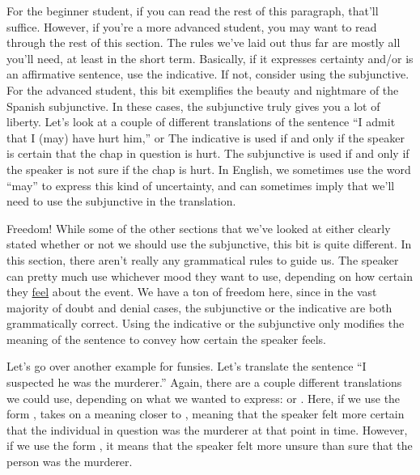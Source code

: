 For the beginner student, if you can read the rest of this paragraph, that'll suffice. However, if you're a more advanced student, you may want to read through the rest of this section. The rules we've laid out thus far are mostly all you'll need, at least in the short term. Basically, if it expresses certainty and/or is an affirmative sentence, use the indicative. If not, consider using the subjunctive. \\

For the advanced student, this bit exemplifies the beauty and nightmare of the Spanish subjunctive. In these cases, the subjunctive truly gives you a lot of liberty. Let's look at a couple of different translations of the sentence ``I admit that I (may) have hurt him,''  or  The indicative is used if and only if the speaker is certain that the chap in question is hurt. The subjunctive is used if and only if the speaker is not sure if the chap is hurt. In English, we sometimes use the word ``may'' to express this kind of uncertainty, and can sometimes imply that we'll need to use the subjunctive in the translation.

\begin{conf}{Freedom!}
	While some of the other sections that we've looked at either clearly stated whether or not we should use the subjunctive, this bit is quite different. In this section, there aren't really any grammatical rules to guide us. The speaker can pretty much use whichever mood they want to use, depending on how certain they \underline{feel} about the event. We have a ton of freedom here, since in the vast majority of doubt and denial cases, the subjunctive or the indicative are both grammatically correct. Using the indicative or the subjunctive only modifies the meaning of the sentence to convey how certain the speaker feels. 
\end{conf}

Let's go over another example for funsies. Let's translate the sentence ``I suspected he was the murderer.'' Again, there are a couple different translations we could use, depending on what we wanted to express:  or . Here, if we use the form ,  takes on a meaning closer to , meaning that the speaker felt more certain that the individual in question was the murderer at that point in time. However, if we use the form , it means that the speaker felt more unsure than sure that the person was the murderer. 
